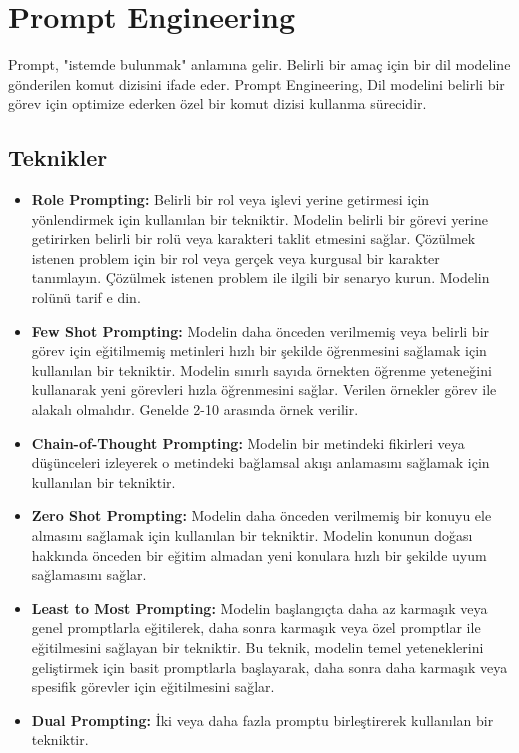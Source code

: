 \section{Prompt Engineering}
Prompt, "istemde bulunmak" anlamına gelir. Belirli bir amaç için bir dil modeline gönderilen komut dizisini ifade eder. Prompt Engineering, Dil modelini belirli bir görev için optimize ederken özel bir komut dizisi kullanma sürecidir.

\subsection{Teknikler}
\begin{itemize}
    \item \textbf{Role Prompting:} Belirli bir rol veya işlevi yerine getirmesi için yönlendirmek için kullanılan bir tekniktir. Modelin belirli bir görevi yerine getirirken belirli bir rolü veya karakteri taklit etmesini sağlar. Çözülmek istenen problem için bir rol veya gerçek veya kurgusal bir karakter tanımlayın. Çözülmek istenen problem ile ilgili bir senaryo kurun. Modelin rolünü tarif e din.
    \item \textbf{Few Shot Prompting:} Modelin daha önceden verilmemiş veya belirli bir görev için eğitilmemiş metinleri hızlı bir şekilde öğrenmesini sağlamak için kullanılan bir tekniktir. Modelin sınırlı sayıda örnekten öğrenme yeteneğini kullanarak yeni görevleri hızla öğrenmesini sağlar. Verilen örnekler görev ile alakalı olmalıdır. Genelde 2-10 arasında örnek verilir.
    \item \textbf{Chain-of-Thought Prompting:} Modelin bir metindeki fikirleri veya düşünceleri izleyerek o metindeki bağlamsal akışı anlamasını sağlamak için kullanılan bir tekniktir. 
    \item \textbf{Zero Shot Prompting:} Modelin daha önceden verilmemiş bir konuyu ele almasını sağlamak için kullanılan bir tekniktir. Modelin konunun doğası hakkında önceden bir eğitim almadan yeni konulara hızlı bir şekilde uyum sağlamasını sağlar.
    \item \textbf{Least to Most Prompting:} Modelin başlangıçta daha az karmaşık veya genel promptlarla eğitilerek, daha sonra karmaşık veya özel promptlar ile eğitilmesini sağlayan bir tekniktir. Bu teknik, modelin temel yeteneklerini geliştirmek için basit promptlarla başlayarak, daha sonra daha karmaşık veya spesifik görevler için eğitilmesini sağlar.
    \item \textbf{Dual Prompting:} İki veya daha fazla promptu birleştirerek kullanılan bir tekniktir. 

\end{itemize}
